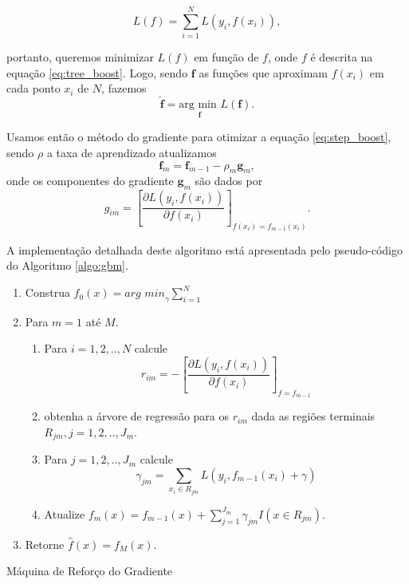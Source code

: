 \begin{equation}
    L(f) = \sum_{i=1}^N L(y_i,f(x_i)),
\end{equation}

portanto, queremos minimizar $L(f)$ em função de $f$, onde $f$ é descrita na equação \ref{eq:tree_boost}. Logo, sendo $\boldsymbol{f}$ as funções que aproximam $f(x_i)$ em cada ponto $x_i$ de $N$, fazemos
\begin{equation}
\label{eq:step_boost}
\hat{\boldsymbol{f}} = \underset{\boldsymbol{f}}{\text{arg min }}L(\boldsymbol{f}).
\end{equation}

Usamos então o método do gradiente para otimizar a equação \ref{eq:step_boost}, sendo $\rho$ a taxa de aprendizado atualizamos
\begin{equation}
    \boldsymbol{f}_m = \boldsymbol{f}_{m-1} - \rho_m \boldsymbol{g}_m,
\end{equation}
onde os componentes do gradiente $\boldsymbol{g}_m$ são dados por
\begin{equation}
    g_{im} = \left[ \frac{\partial L(y_i,f(x_i))}{\partial
                f(x_i)} \right]_{f(x_i)=f_{m-1}(x_i)}.
\end{equation}

A implementação detalhada deste algoritmo está apresentada pelo pseudo-código do Algoritmo \ref{algo:gbm}.

\begin{algorithm}[ht]
    \begin{enumerate}
        \item Construa $f_0(x) = \textit{arg min}_\gamma \sum_{i=1}^N$
        \item Para $m=1$ até $M$.
        \begin{enumerate}
            \item Para $i=1,2,..,N$ calcule
                \[ r_{im} = - \left[ \frac{\partial L(y_i,f(x_i))}{\partial
                f(x_i)} \right]_{f=f_{m-1}}\]
            \item obtenha a árvore de regressão para os $r_{im}$ dada as
                regiões terminais $R_{jm}, j=1,2,..,J_m$.
            \item Para $j=1,2,..,J_m$ calcule
                \[\gamma_{jm} = \sum_{x_i \in R_{jm}}
                L(y_i,f_{m-1}(x_i)+\gamma)\]
            \item Atualize $f_m(x) = f_{m-1}(x) +
                \sum_{j=1}^{J_m} \gamma_{jm}I(x \in R_{jm})$.
        \end{enumerate}
        \item Retorne $\hat{f}(x) = f_M(x)$.
    \end{enumerate}
    \caption{Máquina de Reforço do Gradiente}
    \label{algo:gbm}
\end{algorithm}


